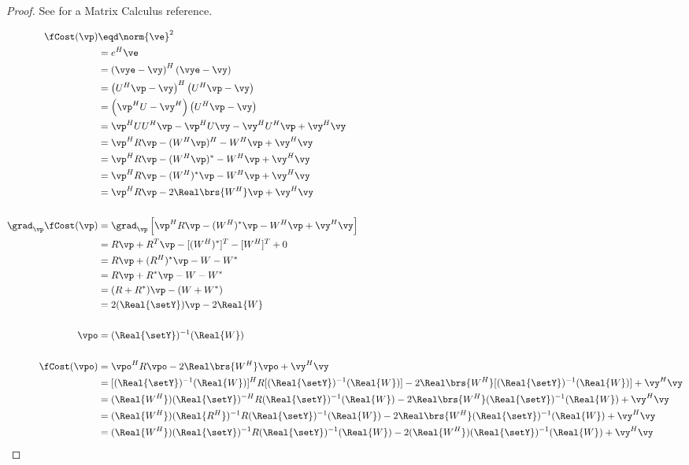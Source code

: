 \begin{proof}
See  for a Matrix Calculus reference.

\begin{align*}
   \fCost(\vp)
     &\eqd \norm{\ve}^2
   \\&=    e^H\ve
   \\&=    \left(\vye-\vy\right)^H\left(\vye-\vy\right)
   \\&=    \left(U^H\vp-\vy\right)^H\left(U^H\vp-\vy\right)
   \\&=    \left(\vp^HU-\vy^H\right)\left(U^H\vp-\vy\right)
   \\&=    \vp^HUU^H\vp - \vp^HU\vy -\vy^HU^H\vp + \vy^H\vy
   \\&=    \vp^H R \vp - (W^H\vp)^H -W^H\vp + \vy^H\vy
   \\&=    \vp^H R \vp - (W^H\vp)^\ast -W^H\vp + \vy^H\vy
   \\&=    \vp^H R \vp - (W^H)^\ast\vp -W^H\vp + \vy^H\vy
   \\&=    \vp^H R \vp - 2\Real\brs{W^H}\vp + \vy^H\vy
\\
\\
   \grad_\vp \fCost(\vp)
     &= \grad_\vp \left[ \vp^H R \vp - (W^H)^\ast\vp -W^H\vp + \vy^H\vy \right]
   \\&= R\vp + R^T\vp - [(W^H)^\ast]^T - [W^H]^T + 0
   \\&= R\vp + (R^H)^\ast\vp - W - W^\ast
   \\&= R\vp + R^\ast\vp - W - W^\ast
   \\&= (R + R^\ast)\vp - (W + W^\ast)
   \\&= 2(\Real{\setY})\vp - 2\Real{W}
\\
\\
   \vpo
     &= (\Real{\setY})^{-1}(\Real{W})
\\
\\
   \fCost(\vpo)
     &=    \vpo^H R \vpo - 2\Real\brs{W^H}\vpo + \vy^H\vy
   \\&=    [(\Real{\setY})^{-1}(\Real{W})]^H R [(\Real{\setY})^{-1}(\Real{W})] - 2\Real\brs{W^H}[(\Real{\setY})^{-1}(\Real{W})] + \vy^H\vy
   \\&=    (\Real{W^H})(\Real{\setY})^{-H} R (\Real{\setY})^{-1}(\Real{W})     - 2\Real\brs{W^H}(\Real{\setY})^{-1}(\Real{W})       + \vy^H\vy
   \\&=    (\Real{W^H})(\Real{R^H})^{-1} R (\Real{\setY})^{-1}(\Real{W})   - 2\Real\brs{W^H}(\Real{\setY})^{-1}(\Real{W})     + \vy^H\vy
   \\&=    (\Real{W^H})(\Real{\setY})^{-1} R (\Real{\setY})^{-1}(\Real{W})     - 2(\Real{W^H})(\Real{\setY})^{-1}(\Real{W})      + \vy^H\vy

\end{align*}
\end{proof}
